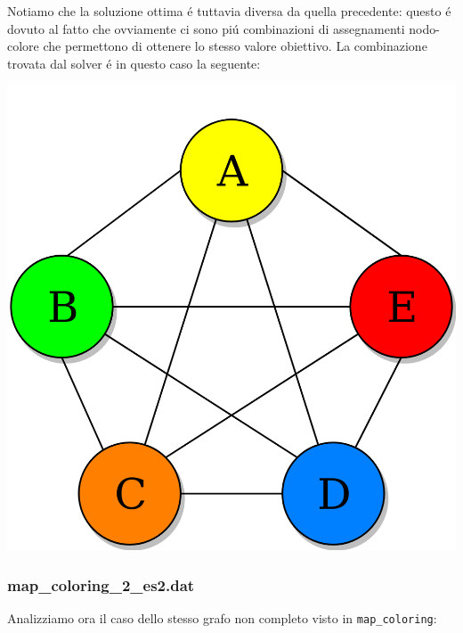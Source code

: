 \documentclass{article}
\begin{document}
\pagebreak 

Notiamo che la soluzione ottima \'e tuttavia diversa da quella precedente: questo \'e dovuto al fatto che ovviamente ci sono pi\'u combinazioni di assegnamenti nodo-colore che permettono di ottenere lo stesso valore obiettivo. La combinazione trovata dal solver \'e in questo caso la seguente:\\

\begin{center}
\includegraphics[scale=0.15]{complete_graph_coloured2.png}
\end{center}

\pagebreak

\subsubsection{map\_coloring\_2\_es2.dat}
Analizziamo ora il caso dello stesso grafo non completo visto in \texttt{map\_coloring}:\\
\end{document}
